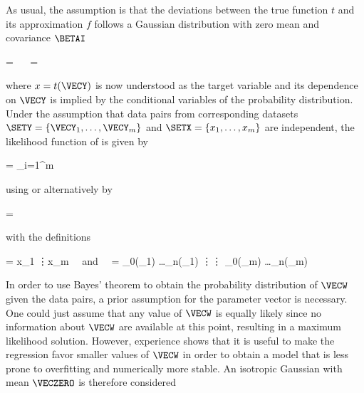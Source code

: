    As usual, the assumption is that the deviations between the true function
    $t$ and its approximation $f$ follows a Gaussian distribution with zero
    mean and covariance $\BETAI$

    \placeformula
    \startformula
    \startalign[n=3,align={left,right,left}]
        \NC \NC {} = \NC
                 \NR
        \NC \Rightarrow~~ \NC {} = \NC
             \EQCOMMA {}
    \stopalign
    \stopformula

    where $x = t(\VECY)$ is now understood as the target variable and its
    dependence on $\VECY$ is implied by the conditional variables of the
    probability distribution. Under the assumption that data pairs from
    corresponding datasets $\SETY = \{ \VECY_1, \dots, \VECY_m \}$ and $\SETX
    = \{ x_1, \dots, x_m \}$ are independent, the likelihood function of
    is given by

    \startformula
        \RLIKELIHOOD = \prod_{i=1}^{m} 
    \stopformula
    
    using  or alternatively by

    \startformula
        \RLIKELIHOOD = \GAUSS{\VECX}{\MATPHI \VECW}{\BETAI \MATID}
    \stopformula
    
    with the definitions

    \startformula
        \VECX = \startpmatrix x_1 \NR \vdots\NR x_m \NR \stoppmatrix
        {\rm ~~and~~}
        \MATPHI = \startpmatrix[n=3,align={middle,middle,middle}]
            \NC \phi_0(\VECY_1) \NC \dots \NC \phi_n(\VECY_1) \NR
            \NC \vdots \NC \ddots \NC \vdots \NR
            \NC \phi_0(\VECY_m) \NC \dots \NC \phi_n(\VECY_m) \NR
        \stoppmatrix
        \EQSTOP
    \stopformula
    
    In order to use Bayes' theorem to obtain the probability distribution of
    $\VECW$ given the data pairs, a prior assumption for the parameter vector
    is necessary. One could just assume that any value of $\VECW$ is equally
    likely since no information about $\VECW$ are available at this point,
    resulting in a maximum likelihood solution.  However, experience shows that
    it is useful to make the regression favor smaller values of $\VECW$ in
    order to obtain a model that is less prone to overfitting and numerically
    more stable. An isotropic Gaussian with mean $\VECZERO$ is therefore
    considered

